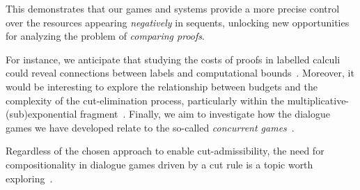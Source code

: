 
This  demonstrates that our games and systems provide a more precise control over the resources appearing {\em negatively} in sequents, unlocking new opportunities for analyzing the problem of {\em comparing proofs}. 

For instance, we anticipate that studying the costs of proofs in labelled calculi could reveal connections between labels and computational bounds~\cite{DBLP:journals/jfp/AccattoliGK20}.
%
Moreover, it would be interesting to explore the relationship between budgets and the complexity of the cut-elimination process, particularly within the multiplicative-(sub)exponential fragment~\cite{DBLP:journals/tcs/Strassburger03,DBLP:journals/tocl/StrassburgerG11}.
%
Finally, we aim to investigate how the dialogue games we have developed relate to the so-called {\em concurrent games}~\cite{DBLP:conf/lics/AbramskyM99, DBLP:conf/lics/FaggianM05,DBLP:journals/lmcs/CastellanCRW17}. 


Regardless of the chosen approach to enable cut-admissibility, the need for compositionality in dialogue games driven by a cut rule is a topic worth exploring~\cite{dutilh18}.

